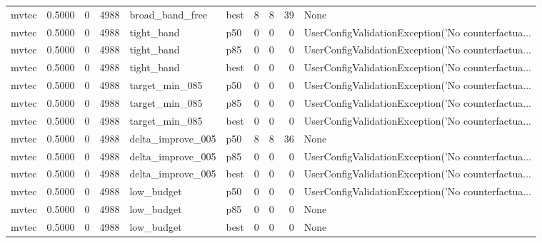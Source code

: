 \begin{tabular}{lrrrllrrrl}
   mvtec &    0.5000 &    0 &   4988 &      broad\_band\_free &   best &               8 &          8 &      39 &                                               None \\
   mvtec &    0.5000 &    0 &   4988 &           tight\_band &    p50 &               0 &          0 &       0 & UserConfigValidationException('No counterfactua... \\
   mvtec &    0.5000 &    0 &   4988 &           tight\_band &    p85 &               0 &          0 &       0 & UserConfigValidationException('No counterfactua... \\
   mvtec &    0.5000 &    0 &   4988 &           tight\_band &   best &               0 &          0 &       0 & UserConfigValidationException('No counterfactua... \\
   mvtec &    0.5000 &    0 &   4988 &       target\_min\_085 &    p50 &               0 &          0 &       0 & UserConfigValidationException('No counterfactua... \\
   mvtec &    0.5000 &    0 &   4988 &       target\_min\_085 &    p85 &               0 &          0 &       0 & UserConfigValidationException('No counterfactua... \\
   mvtec &    0.5000 &    0 &   4988 &       target\_min\_085 &   best &               0 &          0 &       0 & UserConfigValidationException('No counterfactua... \\
   mvtec &    0.5000 &    0 &   4988 &    delta\_improve\_005 &    p50 &               8 &          8 &      36 &                                               None \\
   mvtec &    0.5000 &    0 &   4988 &    delta\_improve\_005 &    p85 &               0 &          0 &       0 & UserConfigValidationException('No counterfactua... \\
   mvtec &    0.5000 &    0 &   4988 &    delta\_improve\_005 &   best &               0 &          0 &       0 & UserConfigValidationException('No counterfactua... \\
   mvtec &    0.5000 &    0 &   4988 &           low\_budget &    p50 &               0 &          0 &       0 & UserConfigValidationException('No counterfactua... \\
   mvtec &    0.5000 &    0 &   4988 &           low\_budget &    p85 &               0 &          0 &       0 &                                               None \\
   mvtec &    0.5000 &    0 &   4988 &           low\_budget &   best &               0 &          0 &       0 &                                               None \\

\end{tabular}
